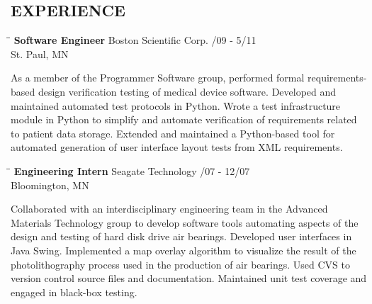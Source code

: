 \documentclass{res}
\begin{document}
 

\address{ 730 Stinson Blvd Apt 319 \\   Minneapolis, MN 55413 \\ nicolasmiller@gmail.com \\   612-965-1669}
                                  
\begin{resume}    
 
\section{EXPERIENCE}
   \vspace{-0.05in}	
   \begin{tabbing}
   \hspace{2.3in}\= \hspace{2.6in}\= \kill %
    {\bf Software Engineer} \>Boston Scientific Corp.     /09 - 5/11\\
                             \>St. Paul, MN
   \end{tabbing}\vspace{-18pt}      %
    As a member of the Programmer Software group, performed formal requirements-based design verification testing of medical device 		software. Developed and maintained automated test protocols in Python. Wrote a test infrastructure module in Python to simplify and automate verification of requirements related to patient data storage. Extended and maintained a Python-based tool for automated generation of user interface layout tests from XML requirements. 
   \begin{tabbing}
   \hspace{2.3in}\= \hspace{2.6in}\= \kill %
    {\bf Engineering Intern} \>Seagate Technology /07 - 12/07 \\
                          \>Bloomington, MN 
   \end{tabbing}\vspace{-18pt}
   	Collaborated with an interdisciplinary engineering team in the Advanced Materials Technology group to develop
   	software tools automating aspects of the design and testing of hard disk drive air bearings. Developed user interfaces
   	in Java Swing. Implemented a map overlay algorithm to visualize the result of the photolithography process used in the production of air bearings. Used CVS to version control source files and documentation. Maintained unit test coverage and engaged in 			      black-box testing.


\end{resume}
\end{document}

